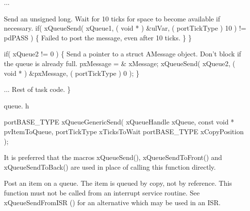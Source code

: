 \begin{DoxyPre}...
\begin{DoxyVerb}    if( xQueue1 != 0 )
    {
\end{DoxyVerb}

Send an unsigned long.  Wait for 10 ticks for space to become
available if necessary.
                if( xQueueSend( xQueue1, ( void * ) \&ulVar, ( portTickType ) 10 ) != pdPASS )
                \{
Failed to post the message, even after 10 ticks.
                \}
        \}\end{DoxyPre}



\begin{DoxyPre}        if( xQueue2 != 0 )
        \{
Send a pointer to a struct AMessage object.  Don't block if the
queue is already full.
                pxMessage = \& xMessage;
                xQueueSend( xQueue2, ( void * ) \&pxMessage, ( portTickType ) 0 );
        \}\end{DoxyPre}



\begin{DoxyPre}... Rest of task code.
 \}
 \end{DoxyPre}


queue. h 
\begin{DoxyPre}
 portBASE\_TYPE xQueueGenericSend(
                                                                        xQueueHandle xQueue,
                                                                        const void * pvItemToQueue,
                                                                        portTickType xTicksToWait
                                                                        portBASE\_TYPE xCopyPosition
                                                                );
   \end{DoxyPre}


It is preferred that the macros x\-Queue\-Send(), x\-Queue\-Send\-To\-Front() and x\-Queue\-Send\-To\-Back() are used in place of calling this function directly.

Post an item on a queue. The item is queued by copy, not by reference. This function must not be called from an interrupt service routine. See x\-Queue\-Send\-From\-I\-S\-R () for an alternative which may be used in an I\-S\-R.


